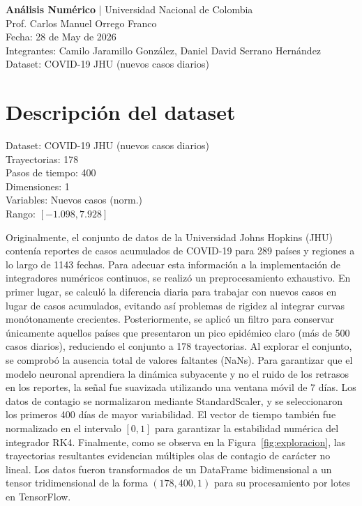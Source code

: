 \documentclass[12pt]{article}
\begin{document}
\begin{center}
\textbf{Análisis Numérico} | Universidad Nacional de Colombia\\
Prof. Carlos Manuel Orrego Franco\\
Fecha: 28 de May de 2026\\
Integrantes: Camilo Jaramillo González, Daniel David Serrano Hernández\\
Dataset: COVID-19 JHU (nuevos casos diarios)
\end{center}

\section{Descripción del dataset}

Dataset: COVID-19 JHU (nuevos casos diarios)\\
Trayectorias: 178\\
Pasos de tiempo: 400\\
Dimensiones: 1\\
Variables: Nuevos casos (norm.)\\
Rango: $[-1.098, 7.928]$

Originalmente, el conjunto de datos de la Universidad Johns Hopkins (JHU) contenía reportes de casos acumulados de COVID-19 para 289 países y regiones a lo largo de 1143 fechas. Para adecuar esta información a la implementación de integradores numéricos continuos, se realizó un preprocesamiento exhaustivo. En primer lugar, se calculó la diferencia diaria para trabajar con nuevos casos en lugar de casos acumulados, evitando así problemas de rigidez al integrar curvas monótonamente crecientes. Posteriormente, se aplicó un filtro para conservar únicamente aquellos países que presentaron un pico epidémico claro (más de 500 casos diarios), reduciendo el conjunto a 178 trayectorias. Al explorar el conjunto, se comprobó la ausencia total de valores faltantes (NaNs). Para garantizar que el modelo neuronal aprendiera la dinámica subyacente y no el ruido de los retrasos en los reportes, la señal fue suavizada utilizando una ventana móvil de 7 días. Los datos de contagio se normalizaron mediante StandardScaler, y se seleccionaron los primeros 400 días de mayor variabilidad. El vector de tiempo también fue normalizado en el intervalo $[0, 1]$ para garantizar la estabilidad numérica del integrador RK4. Finalmente, como se observa en la Figura~\ref{fig:exploracion}, las trayectorias resultantes evidencian múltiples olas de contagio de carácter no lineal. Los datos fueron transformados de un DataFrame bidimensional a un tensor tridimensional de la forma $(178, 400, 1)$ para su procesamiento por lotes en TensorFlow.
\end{document}

